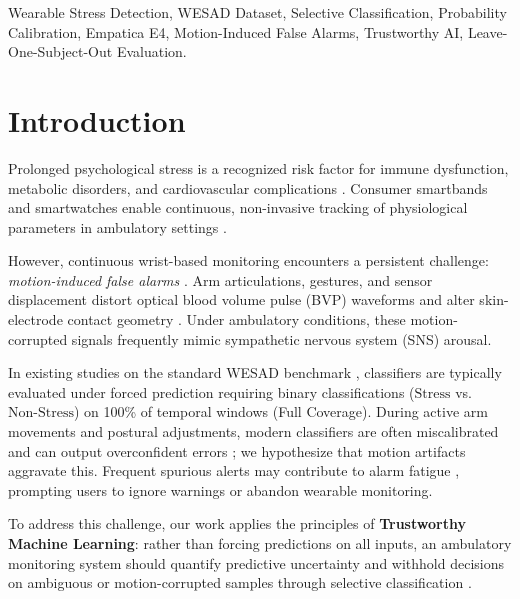 \documentclass[conference]{IEEEtran}
\begin{document}
\begin{IEEEkeywords}
Wearable Stress Detection, WESAD Dataset, Selective Classification, Probability Calibration, Empatica E4, Motion-Induced False Alarms, Trustworthy AI, Leave-One-Subject-Out Evaluation.
\end{IEEEkeywords}

\section{Introduction}
Prolonged psychological stress is a recognized risk factor for immune dysfunction, metabolic disorders, and cardiovascular complications \cite{cohen2007psychological, schneiderman2005stress, can2019stress}. Consumer smartbands and smartwatches enable continuous, non-invasive tracking of physiological parameters in ambulatory settings \cite{gjoreski2016continuous, schmidt2018wesad, sano2015recognizing}.

However, continuous wrist-based monitoring encounters a persistent challenge: \textit{motion-induced false alarms} \cite{schumm2008effect, tamura2014wearable, zhang2014troika}. Arm articulations, gestures, and sensor displacement distort optical blood volume pulse (BVP) waveforms and alter skin-electrode contact geometry \cite{boucsein2012electrodermal}. Under ambulatory conditions, these motion-corrupted signals frequently mimic sympathetic nervous system (SNS) arousal.

In existing studies on the standard WESAD benchmark \cite{schmidt2018wesad, bobade2020stress, dalmeida2021hrv, behinaein2021transformer}, classifiers are typically evaluated under forced prediction requiring binary classifications ($\text{Stress}$ vs. $\text{Non-Stress}$) on 100\% of temporal windows (Full Coverage). During active arm movements and postural adjustments, modern classifiers are often miscalibrated and can output overconfident errors \cite{guo2017calibration}; we hypothesize that motion artifacts aggravate this. Frequent spurious alerts may contribute to alarm fatigue \cite{sendelbach2013alarm}, prompting users to ignore warnings or abandon wearable monitoring.

To address this challenge, our work applies the principles of \textbf{Trustworthy Machine Learning}: rather than forcing predictions on all inputs, an ambulatory monitoring system should quantify predictive uncertainty and withhold decisions on ambiguous or motion-corrupted samples through selective classification \cite{chow1970optimum, cortes2016learning, geifman2017selective, geifman2019selectivenet, grandvalet2008support, hendrickx2024machine}.
\end{document}
